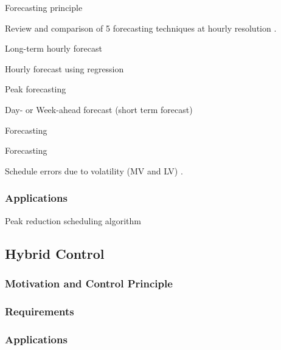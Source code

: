 Forecasting principle \cite{Ramanathan1997}

Review and comparison of 5 forecasting techniques at hourly resolution \cite{Moghram1989}.

Long-term hourly forecast \cite{Filik2011}

Hourly forecast using regression \cite{Papalexopoulos1990}

Peak forecasting \cite{Barakat1990}

Day- or Week-ahead forecast (short term forecast) \cite{Hyde1997}

Forecasting \cite{Charlton2014}

Forecasting \cite{Taieb2013}

Schedule errors due to volatility (MV and LV) \cite{Haben2014}.

\subsubsection{Applications}

Peak reduction scheduling algorithm \cite{Rowe2014a}

\subsection{Hybrid Control}

\subsubsection{Motivation and Control Principle}

\subsubsection{Requirements}

\subsubsection{Applications}

%
